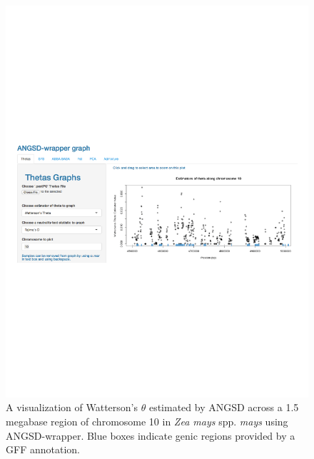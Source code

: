 \documentclass[10pt,a4paper]{article}
\begin{document}
\begin{figure}
\centering
\includegraphics[width=0.8\linewidth]{figures/fig1.pdf}
\caption{A visualization of Watterson's $\theta$ estimated by ANGSD across a 1.5 megabase region of chromosome 10 in {\it Zea mays} spp. {\it mays} using ANGSD-wrapper. Blue boxes indicate genic regions provided by a GFF annotation. \label{fig:theta} }
\end{figure}

\end{document}

